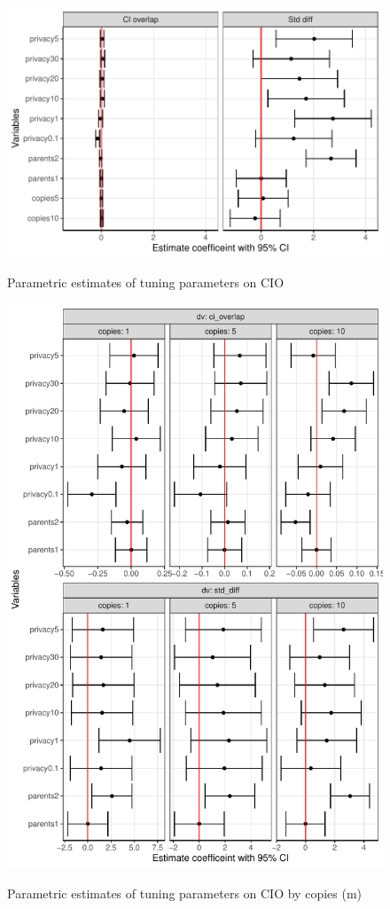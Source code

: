 \documentclass[12pt]{article}
\begin{document}
\begin{figure}[!h]
    \centering
    \caption{Parametric estimates of tuning parameters on CIO}
    \includegraphics{../graphs/datasynthesizer/graph_datasynthesizer_cio.pdf}
    \label{graph_datasynthesizer_cio}
\end{figure}

\begin{figure}[!h]
    \centering
    \caption{Parametric estimates of tuning parameters on CIO by copies (m)}
    \includegraphics{../graphs/datasynthesizer/graph_datasynthesizer_cio_facet.pdf}
    \label{graph_datasynthesizer_cio_facet}
\end{figure}
\end{document}
